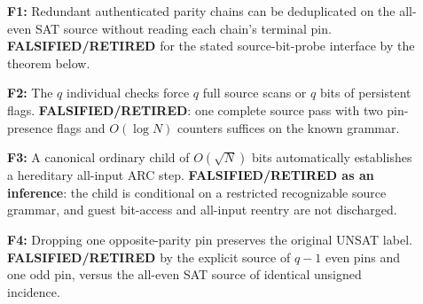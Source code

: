 \documentclass[11pt]{article}
\begin{document}
\begin{description}
\item[] \textbf{F1:} Redundant authenticated parity chains can be deduplicated on the all-even SAT source without reading each chain's terminal pin. \textbf{FALSIFIED/RETIRED} for the stated source-bit-probe interface by the theorem below.
\item[] \textbf{F2:} The $q$ individual checks force $q$ full source scans or $q$ bits of persistent flags. \textbf{FALSIFIED/RETIRED}: one complete source pass with two pin-presence flags and $O(\log N)$ counters suffices on the known grammar.
\item[] \textbf{F3:} A canonical ordinary child of $O(\sqrt N)$ bits automatically establishes a hereditary all-input ARC step. \textbf{FALSIFIED/RETIRED as an inference}: the child is conditional on a restricted recognizable source grammar, and guest bit-access and all-input reentry are not discharged.
\item[] \textbf{F4:} Dropping one opposite-parity pin preserves the original UNSAT label. \textbf{FALSIFIED/RETIRED} by the explicit source of $q-1$ even pins and one odd pin, versus the all-even SAT source of identical unsigned incidence.
\end{description}
\end{document}
